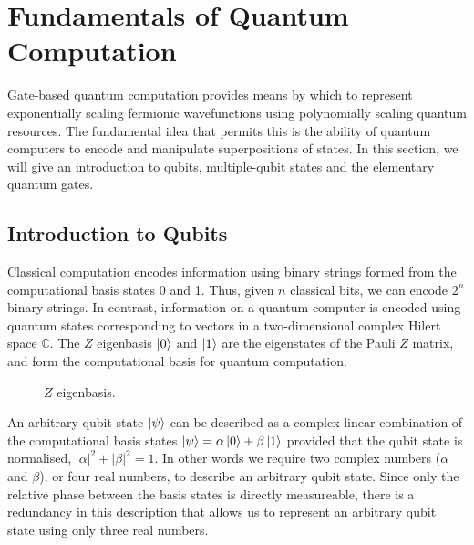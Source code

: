 \section{Fundamentals of Quantum Computation}%
\label{quantum-computation}

Gate-based quantum computation provides means by which to represent exponentially scaling fermionic wavefunctions using polynomially scaling quantum resources. The fundamental idea that permits this is the ability of quantum computers to encode and manipulate superpositions of states. In this section, we will give an introduction to qubits, multiple-qubit states and the elementary quantum gates.

\subsection{Introduction to Qubits}

Classical computation encodes information using binary strings formed from the computational basis states 0 and 1. Thus, given $n$ classical bits, we can encode $2^n$ binary strings. In contrast, information on a quantum computer is encoded using quantum states corresponding to vectors in a two-dimensional complex Hilert space $\mathbb{C}$. The $Z$ eigenbasis $\ket 0$ and $\ket 1$ are the eigenstates of the Pauli $Z$ matrix, and form the computational basis for quantum computation.

\begin{figure}[H]
    \centering
    \begin{minipage}{.45\textwidth}
        \centering
    \end{minipage}%
    \begin{minipage}{0.45\textwidth}
        \centering
    \end{minipage}
    \caption{$Z$ eigenbasis.}
    \label{z-eigenstates}
\end{figure}

An arbitrary qubit state $\ket\psi$ can be described as a complex linear combination of the computational basis states $\ket\psi = \alpha\ket 0 + \beta\ket 1$ provided that the qubit state is normalised, $|\alpha|^2 + |\beta|^2 = 1$. In other words we require two complex numbers ($\alpha$ and $\beta$), or four real numbers, to describe an arbitrary qubit state. Since only the relative phase between the basis states is directly measureable, there is a redundancy in this description that allows us to represent an arbitrary qubit state using only three real numbers.

